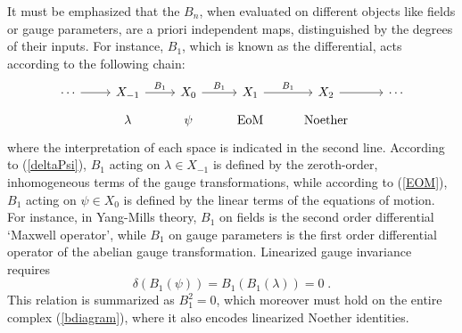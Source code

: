 \documentclass[12pt]{article}\pdfoutput=1
\def\be{\begin{equation}}
\def\ee{\end{equation}}
\begin{document}
It must be emphasized that the 
$B_n$,  when evaluated on different objects like fields or gauge parameters, are a priori independent maps, 
distinguished by the degrees of their  inputs. 
For instance, $B_1$, which is known as the differential, acts according to the following chain:  
\begin{equation}\label{bdiagram}
\begin{tikzcd}[row sep=2mm]
\cdots \arrow{r}
&X_{-1}\arrow{r}{B_1} & X_{0}\arrow{r}{B_1} & X_1\arrow{r}{B_1} & X_2  \arrow{r} &\cdots \\
&\lambda& \psi & {\rm EoM}  & {\rm Noether} 
\end{tikzcd}
\end{equation}
where the interpretation of each space is indicated in the second line. 
According to (\ref{deltaPsi}), $B_1$ acting on $\lambda\in X_{-1}$  is defined by the zeroth-order, inhomogeneous terms  
of the gauge transformations, while according to (\ref{EOM}),  $B_1$ acting on $\psi\in X_0$ is defined by the 
linear terms of the equations of motion. For instance, in Yang-Mills theory, $B_1$ on fields is  the second order differential 
`Maxwell operator', while $B_1$ on gauge parameters is the first order differential operator of the abelian gauge transformation.  
Linearized gauge invariance requires 
 \be
  \delta (B_1(\psi)) = B_1(B_1(\lambda)) = 0 \;. 
 \ee 
This relation is summarized as $B_1^2=0$, which moreover must hold on the entire complex (\ref{bdiagram}), 
where it also encodes linearized Noether identities.  
\end{document}
